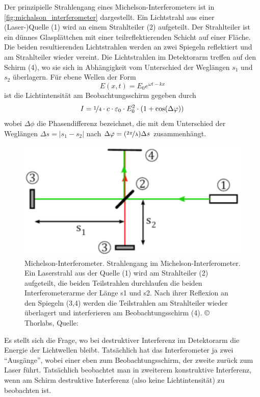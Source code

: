 \documentclass[ngerman]{scrartcl}
\begin{document}
Der prinzipielle Strahlengang eines Michelson-Interferometers ist in \autoref{fig:michalson_interferometer} dargestellt. Ein Lichtstrahl aus einer (Laser-)Quelle (1) wird an einem Strahlteiler (2) aufgeteilt. Der Strahlteiler ist ein dünnes Glasplättchen mit einer teilreflektierenden Schicht auf einer Fläche. Die beiden resultierenden Lichtstrahlen werden an zwei Spiegeln reflektiert und am Strahlteiler wieder vereint. Die Lichtstrahlen im Detektorarm treffen auf den Schirm (4), wo sie sich in Abhängigkeit vom Unterschied der Weglängen $s_1$ und $s_2$ überlagern. Für ebene Wellen der Form
\begin{equation}
    E(x,t) = E_0 e^{\omega t - k x}
\end{equation}
ist die Lichtintensität am Beobachtungsschirm gegeben durch
\begin{equation}
    I = \nicefrac{1}{4} \cdot c \cdot \varepsilon_0 \cdot E_0^2 \cdot (1 + \cos(\Delta \varphi))
\end{equation}
wobei $\Delta \phi$ die Phasendifferenz bezeichnet, die mit dem Unterschied der Weglängen\linebreak
$\Delta s = \left| s_1 - s_2 \right|$ nach $\Delta \varphi = (\nicefrac{2 \pi}{\lambda})\Delta s$ zusammenhängt.
%
\begin{figure}[H]
    \centering
    \begin{samepage}
        \includegraphics[width=0.6\linewidth]{fig/Compressed/Angabe_Abb8.png}
        \caption[Michelson-Interferometer]{Michelson-Interferometer. Strahlengang im Michelson-Interferometer. Ein Laserstrahl aus der Quelle (1) wird am Strahlteiler (2) aufgeteilt, die beiden Teilstrahlen durchlaufen die beiden Interferometerarme der Länge s1 und s2. Nach ihrer Reflexion an den Spiegeln (3,4) werden die Teilstrahlen am Strahlteiler wieder überlagert und interferieren am Beobachtungsschirm (4). \copyright{} Thorlabs, Quelle: \cite{ref:angabe}}
        \label{fig:michalson_interferometer}
    \end{samepage}
\end{figure}
%
Es stellt sich die Frage, wo bei destruktiver Interferenz im Detektorarm die Energie der Lichtwellen bleibt. Tatsächlich hat das Interferometer ja zwei \enquote{Ausgänge}, wobei einer eben zum Beobachtungsschirm, der zweite zurück zum Laser führt. Tatsächlich beobachtet man in zweiterem konstruktive Interferenz, wenn am Schirm destruktive Interferenz (also keine Lichtintensität) zu beobachten ist.
\end{document}
